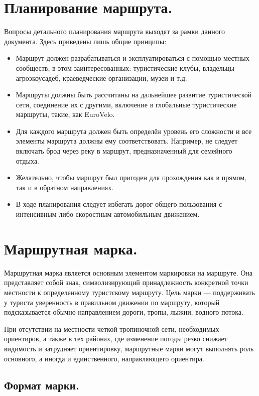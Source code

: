 \documentclass[a4paper,12pt]{extarticle}
\begin{document}
\section{Планирование маршрута.}

Вопросы детального планирования маршрута выходят за рамки данного документа. Здесь приведены лишь общие принципы:
\begin{itemize}
	\item Маршрут должен разрабатываться и эксплуатироваться с помощью местных сообществ, в этом заинтересованных:
		туристические клубы, владельцы агроэкоусадеб, краеведческие организации, музеи и т.д.
	\item Маршруты должны быть рассчитаны на дальнейшее развитие туристической сети, соединение их с другими,
		включение в глобальные туристические маршруты, такие, как EuroVelo.
	\item Для каждого маршрута должен быть определён уровень его сложности и все элементы маршрута должны ему
		соответствовать. Например, не следует включать брод через реку в маршрут, предназначенный для семейного
		отдыха.
	\item Желательно, чтобы маршрут был пригоден для прохождения как в прямом, так и в обратном направлениях.
	\item В ходе планирования следует избегать дорог общего пользования с интенсивным либо скоростным автомобильным
		движением.
\end{itemize}


\section{Маршрутная марка.}

Маршрутная марка является основным элементом маркировки на маршруте. Она представляет собой знак, символизирующий
принадлежность конкретной точки местности к определенному туристскому маршруту. Цель марки --- поддерживать у туриста
уверенность в правильном движении по маршруту, который подсказывается обычно направлением дороги, тропы, лыжни, водного
потока.

При отсутствии на местности четкой тропиночной сети, необходимых ориентиров, а также в тех районах, где изменение погоды
резко снижает видимость и затрудняет ориентировку, маршрутные марки могут выполнять роль основного, а иногда и
единственного, направляющего ориентира.

\subsection{Формат марки.}
\end{document}
